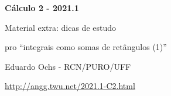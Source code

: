 \documentclass[oneside,12pt]{article}
\begin{document}


\long{}
\long{}
\long{}
\long{}
\long{}
\long{}
\long{}
\long{}
\long{}
\long{}
\long{}

\long{}
\long{}

\def\frown{\ensuremath{{=}{(}}}
\def\True {\mathbf{V}}
\def\False{\mathbf{F}}
\def\D    {\displaystyle}

\def\drafturl{http://angg.twu.net/LATEX/2021-1-C2.pdf}
\def\drafturl{http://angg.twu.net/2021.1-C2.html}
\def\draftfooter{\tiny \href{\drafturl}{\jobname{}} \ColorBrown{\shorttoday{} \hours}}



%

\thispagestyle{empty}

\begin{center}

\vspace*{1.2cm}

{\bf \Large Cálculo 2 - 2021.1}

\bsk

Material extra: dicas de estudo

pro ``integrais como somas de retângulos (1)''

\bsk

Eduardo Ochs - RCN/PURO/UFF

\url{http://angg.twu.net/2021.1-C2.html}

\end{center}
\end{document}
